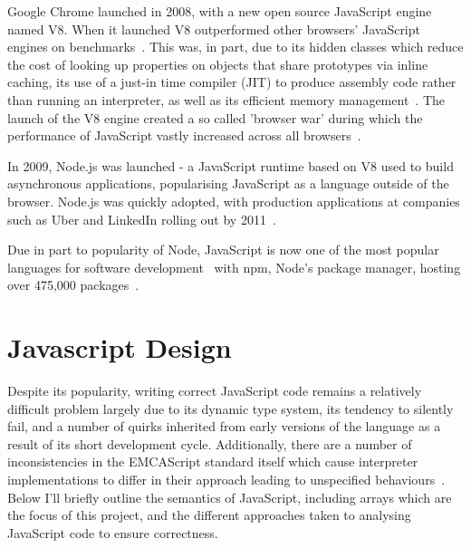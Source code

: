 \documentclass[]{final_report}
\begin{document}
Google Chrome launched in 2008, with a new open source JavaScript engine named V8. When it launched V8 outperformed other browsers' JavaScript engines on benchmarks~\cite{chromebenchmarks}. This was, in part, due to its hidden classes which reduce the cost of looking up properties on objects that share prototypes via inline caching, its use of a just-in time compiler (JIT) to produce assembly code rather than running an interpreter, as well as its efficient memory management~\cite{chromeengine, chromeengine2}. The launch of the V8 engine created a so called 'browser war' during which the performance of JavaScript vastly increased across all browsers~\cite{knowyourenginesmozilla}.

In 2009, Node.js was launched - a JavaScript runtime based on V8 used to build asynchronous applications, popularising JavaScript as a language outside of the browser. Node.js was quickly adopted, with production applications at companies such as Uber and LinkedIn rolling out by 2011~\cite{linkedinusesnode, uberusesnode}. 

Due in part to popularity of Node, JavaScript is now one of the most popular languages for software development~\cite{stackoverflowsurvey, tiobeindex2017nov} with npm, Node's package manager, hosting over 475,000 packages~\cite{npm}.

\section{Javascript Design}

Despite its popularity, writing correct JavaScript code remains a relatively difficult problem largely due to its dynamic type system, its tendency to silently fail, and a number of quirks inherited from early versions of the language as a result of its short development cycle. Additionally, there are a number of inconsistencies in the EMCAScript standard itself which cause interpreter implementations to differ in their approach leading to unspecified behaviours~\cite{park2015kjs}. Below I'll briefly outline the semantics of JavaScript, including arrays which are the focus of this project, and the different approaches taken to analysing JavaScript code to ensure correctness.
\end{document}
